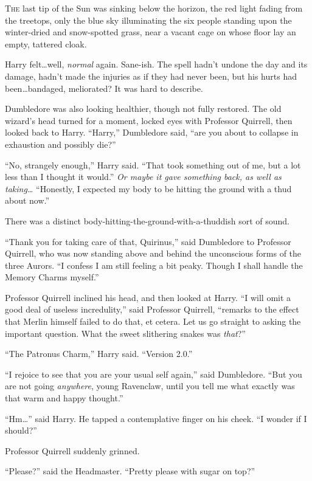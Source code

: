 
\lettrine{T}{he} last tip of the Sun was sinking below the horizon, the red light fading from the treetops, only the blue sky illuminating the six people standing upon the winter-dried and snow-spotted grass, near a vacant cage on whose floor lay an empty, tattered cloak.

Harry felt…well, \emph{normal} again. Sane-ish. The spell hadn’t undone the day and its damage, hadn’t made the injuries as if they had never been, but his hurts had been…bandaged, meliorated? It was hard to describe.

Dumbledore was also looking healthier, though not fully restored. The old wizard’s head turned for a moment, locked eyes with Professor Quirrell, then looked back to Harry.
“Harry,” Dumbledore said, “are you about to collapse in exhaustion and possibly die?”

“No, strangely enough,” Harry said.
“That took something out of me, but a lot less than I thought it would.” \emph{Or maybe it gave something back, as well as taking…}
“Honestly, I expected my body to be hitting the ground with a thud about now.”

There was a distinct body-hitting-the-ground-with-a-thuddish sort of sound.

“Thank you for taking care of that, Quirinus,” said Dumbledore to Professor Quirrell, who was now standing above and behind the unconscious forms of the three Aurors.
“I confess I am still feeling a bit peaky. Though I shall handle the Memory Charms myself.”

Professor Quirrell inclined his head, and then looked at Harry.
“I will omit a good deal of useless incredulity,” said Professor Quirrell, “remarks to the effect that Merlin himself failed to do that, et cetera. Let us go straight to asking the important question. What the sweet slithering snakes was \emph{that}?”

“The Patronus Charm,” Harry said.
“Version 2.0.”

“I rejoice to see that you are your usual self again,” said Dumbledore.
“But you are not going \emph{anywhere}, young Ravenclaw, until you tell me what exactly was that warm and happy thought.”

“Hm…” said Harry. He tapped a contemplative finger on his cheek.
“I wonder if I should?”

Professor Quirrell suddenly grinned.

“Please?” said the Headmaster.
“Pretty please with sugar on top?”

